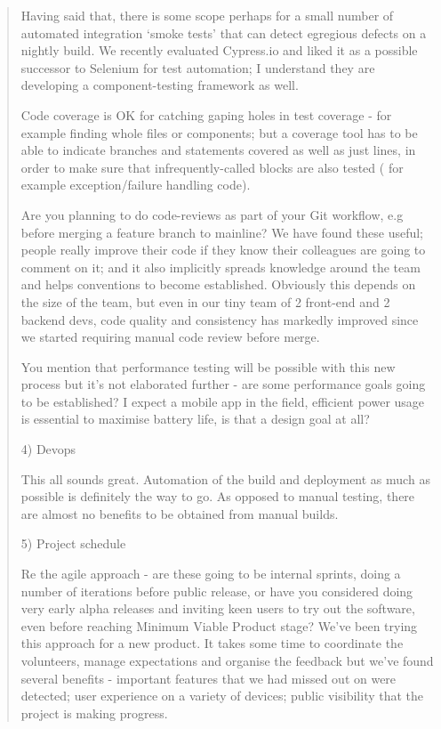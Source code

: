\documentclass[a4paper,headings=small fontsize=10pt]{scrreprt}
\begin{document}
\begin{quote}
Having said that, there is some scope perhaps for a small number of
  automated integration `smoke tests' that can detect egregious defects
  on a nightly build. We recently evaluated Cypress.io and liked it as a
  possible successor to Selenium for test automation; I understand they
  are developing a component-testing framework as well.
 
Code coverage is OK for catching gaping holes in test coverage - for
  example finding whole files or components; but a coverage tool has to
  be able to indicate branches and statements covered as well as just
  lines, in order to make sure that infrequently-called blocks are also
  tested ( for example exception/failure handling code).
 
Are you planning to do code-reviews as part of your Git workflow, e.g
  before merging a feature branch to mainline? We have found these
  useful; people really improve their code if they know their colleagues
  are going to comment on it; and it also implicitly spreads knowledge
  around the team and helps conventions to become established. Obviously
  this depends on the size of the team, but even in our tiny team of 2
  front-end and 2 backend devs, code quality and consistency has
  markedly improved since we started requiring manual code review before
  merge.
 
You mention that performance testing will be possible with this new
  process but it's not elaborated further - are some performance goals
  going to be established? I expect a mobile app in the field, efficient
  power usage is essential to maximise battery life, is that a design
  goal at all?
 

4) Devops

This all sounds great. Automation of the build and deployment as much as
possible is definitely the way to go. As opposed to manual testing,
there are almost no benefits to be obtained from manual builds.

5) Project schedule

Re the agile approach - are these going to be internal sprints, doing a
number of iterations before public release, or have you considered doing
very early alpha releases and inviting keen users to try out the
software, even before reaching Minimum Viable Product stage? We've been
trying this approach for a new product. It takes some time to coordinate
the volunteers, manage expectations and organise the feedback but we've
found several benefits - important features that we had missed out on
were detected; user experience on a variety of devices; public
visibility that the project is making progress.


\end{quote}
\end{document}
